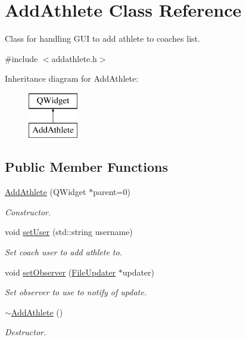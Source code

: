 \hypertarget{classAddAthlete}{}\section{Add\+Athlete Class Reference}
\label{classAddAthlete}


Class for handling G\+UI to add athlete to coaches list.  




{\ttfamily \#include $<$addathlete.\+h$>$}

Inheritance diagram for Add\+Athlete\+:\begin{figure}[H]
\begin{center}
\leavevmode
\includegraphics[height=2.000000cm]{classAddAthlete}
\end{center}
\end{figure}
\subsection*{Public Member Functions}
\begin{DoxyCompactItemize}
\item 
\mbox{\hyperlink{classAddAthlete_a921edacf81e6d501ad54a5de57c85f96}{Add\+Athlete}} (Q\+Widget $\ast$parent=0)
\begin{DoxyCompactList}\small\item\em Constructor. \end{DoxyCompactList}\item 
void \mbox{\hyperlink{classAddAthlete_a5f56e55bedf5f879ca84f05eba60d2c2}{set\+User}} (std\+::string username)
\begin{DoxyCompactList}\small\item\em Set coach user to add athlete to. \end{DoxyCompactList}\item 
void \mbox{\hyperlink{classAddAthlete_a715b92425445010d44ffcf982257aed9}{set\+Observer}} (\mbox{\hyperlink{classFileUpdater}{File\+Updater}} $\ast$updater)
\begin{DoxyCompactList}\small\item\em Set observer to use to notify of update. \end{DoxyCompactList}\item 
\mbox{\hyperlink{classAddAthlete_a07c7ce08c0962c8c03d0a30b654f4b14}{$\sim$\+Add\+Athlete}} ()
\begin{DoxyCompactList}\small\item\em Destructor. \end{DoxyCompactList}\end{DoxyCompactItemize}


